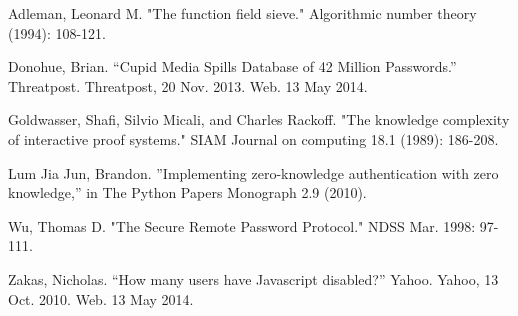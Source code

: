 \documentclass[11pt]{article}
\begin{document}
\begin{thebibliography}{9}
Adleman, Leonard M. "The function field sieve." Algorithmic number theory (1994): 108-121.

Donohue, Brian. “Cupid Media Spills Database of 42 Million Passwords.” Threatpost. Threatpost, 20 Nov. 2013. Web. 13 May 2014.

Goldwasser, Shafi, Silvio Micali, and Charles Rackoff. "The knowledge complexity of interactive proof systems." SIAM Journal on computing 18.1 (1989): 186-208.

Lum Jia Jun, Brandon. ”Implementing zero-knowledge authentication with zero knowledge,” in The Python Papers Monograph 2.9 (2010).

Wu, Thomas D. "The Secure Remote Password Protocol." NDSS Mar. 1998: 97-111.

Zakas, Nicholas. “How many users have Javascript disabled?” Yahoo. Yahoo, 13 Oct. 2010. Web. 13 May 2014.

\end{thebibliography}
\end{document}
